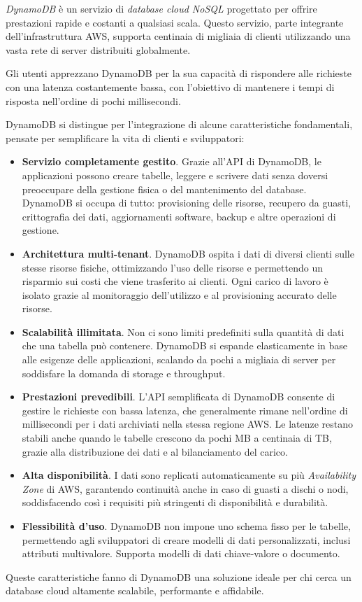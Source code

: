 \textit{DynamoDB} è un servizio di \textit{database cloud NoSQL} progettato per offrire prestazioni rapide e costanti a qualsiasi scala. Questo servizio, parte integrante dell'infrastruttura AWS, supporta centinaia di migliaia di clienti utilizzando una vasta rete di server distribuiti globalmente.

Gli utenti apprezzano DynamoDB per la sua capacità di rispondere alle richieste con una latenza costantemente bassa, con l'obiettivo di mantenere i tempi di risposta nell'ordine di pochi millisecondi.

DynamoDB si distingue per l'integrazione di alcune caratteristiche fondamentali, pensate per semplificare la vita di clienti e sviluppatori:
\begin{itemize}
    \item \textbf{Servizio completamente gestito}. Grazie all'API di DynamoDB, le applicazioni possono creare tabelle, leggere e scrivere dati senza doversi preoccupare della gestione fisica o del mantenimento del database. DynamoDB si occupa di tutto: provisioning delle risorse, recupero da guasti, crittografia dei dati, aggiornamenti software, backup e altre operazioni di gestione.
    \item \textbf{Architettura multi-tenant}. DynamoDB ospita i dati di diversi clienti sulle stesse risorse fisiche, ottimizzando l'uso delle risorse e permettendo un risparmio sui costi che viene trasferito ai clienti. Ogni carico di lavoro è isolato grazie al monitoraggio dell'utilizzo e al provisioning accurato delle risorse.
    \item \textbf{Scalabilità illimitata}. Non ci sono limiti predefiniti sulla quantità di dati che una tabella può contenere. DynamoDB si espande elasticamente in base alle esigenze delle applicazioni, scalando da pochi a migliaia di server per soddisfare la domanda di storage e throughput.
    \item \textbf{Prestazioni prevedibili}. L'API semplificata di DynamoDB consente di gestire le richieste con bassa latenza, che generalmente rimane nell'ordine di millisecondi per i dati archiviati nella stessa regione AWS. Le latenze restano stabili anche quando le tabelle crescono da pochi MB a centinaia di TB, grazie alla distribuzione dei dati e al bilanciamento del carico.
    \item \textbf{Alta disponibilità}. I dati sono replicati automaticamente su più \textit{Availability Zone} di AWS, garantendo continuità anche in caso di guasti a dischi o nodi, soddisfacendo così i requisiti più stringenti di disponibilità e durabilità.
    \item \textbf{Flessibilità d'uso}. DynamoDB non impone uno schema fisso per le tabelle, permettendo agli sviluppatori di creare modelli di dati personalizzati, inclusi attributi multivalore. Supporta modelli di dati chiave-valore o documento.
\end{itemize}
Queste caratteristiche fanno di DynamoDB una soluzione ideale per chi cerca un database cloud altamente scalabile, performante e affidabile.\cite{elhemali2022amazon}